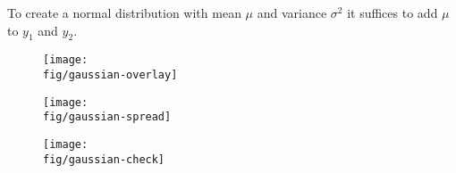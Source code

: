 \documentclass[12pt,a4paper]{article}
\newcommand{\fig}{../fig}
\begin{document}
    To create a normal distribution with mean $\mu$ and variance $\sigma^2$ it suffices to add $\mu$ to $y_1$ and $y_2$.
    \begin{figure}
        \centering
        \texttt{[image: \\fig/gaussian-overlay]}
    \end{figure}
    \begin{figure}
        \centering
        \texttt{[image: \\fig/gaussian-spread]}
    \end{figure}
    \begin{figure}
        \centering
        \texttt{[image: \\fig/gaussian-check]}
    \end{figure}
\end{document}
